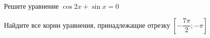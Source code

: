 \begin{ex}
	\begin{condition}
		\begin{enumcols}[label=\asbuk*)]
			\item Решите уравнение \( \cos 2x + \sin x = 0 \)
			\item Найдите все корни уравнения, принадлежащие отрезку \( \left[-\dfrac{7\pi}{2};-\pi\right] \)
		\end{enumcols}
	\end{condition}
\end{ex}